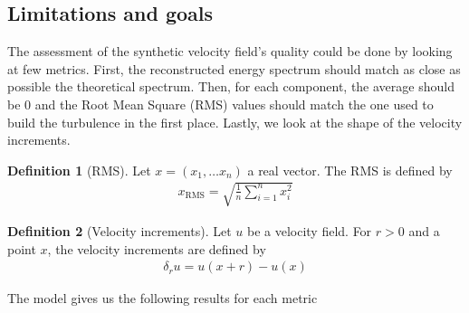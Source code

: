 \documentclass[a4paper,12pt]{article}
\theoremstyle{definition}
\newtheorem{definition}{Definition}
\begin{document}

\subsection{Limitations and goals}
The assessment of the synthetic velocity field's quality could be done by looking at few metrics. First, the reconstructed energy spectrum should match as close as possible the theoretical spectrum. Then, for each component, the average should be 0 and the Root Mean Square (RMS) values should match the one used to build the turbulence in the first place. Lastly, we look at the shape of the velocity increments. \\

\begin{definition}[RMS]
    Let $x=(x_1,\ldots x_n)$ a real vector. The RMS is defined by 
    \begin{align}
        x_\text{RMS} = \sqrt{\frac{1}{n}\sum_{i=1}^{n}x_i^2}
    \end{align}
\end{definition}

\begin{definition}[Velocity increments]
    Let $u$ be a velocity field. For $r>0$ and a point $x$, the velocity increments are defined by 
    \begin{align}
        \delta_r u = u(x+r)-u(x) 
        \label{DefVelIncr}
    \end{align}
\end{definition}

The model gives us the following results for each metric 
\end{document}
